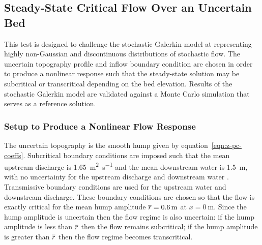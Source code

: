 \subsection{ Steady-State Critical Flow Over an Uncertain Bed}

This test is designed to challenge the stochastic Galerkin model at representing highly non-Gaussian and discontinuous distributions of stochastic flow.
The uncertain topography profile and inflow boundary condition are chosen in order to produce a nonlinear response such that the steady-state solution may be subcritical or transcritical depending on the bed elevation.
Results of the stochastic Galerkin model are validated against a Monte Carlo simulation that serves as a reference solution.

\subsubsection{Setup to Produce a Nonlinear Flow Response}
The uncertain topography is the smooth hump given by equation~\eqref{eqn:z-pc-coeffs}.
Subcritical boundary conditions are imposed such that the mean upstream discharge  is \SI{1.65}{\meter\squared\per\second} and the mean downstream water  is \SI{1.5}{\meter}, with no uncertainty for the upstream discharge and downstream water .
Transmissive boundary conditions are used for the upstream water  and downstream discharge.
These boundary conditions are chosen so that the flow is exactly critical for the mean hump amplitude $\overline{r} = \SI{0.6}{\meter}$ at $x = \SI{0}{\meter}$.
Since the hump amplitude is uncertain then the flow regime is also uncertain: if the hump amplitude is less than $\overline{r}$ then the flow remains subcritical; if the hump amplitude is greater than $\overline{r}$ then the flow regime becomes transcritical.

